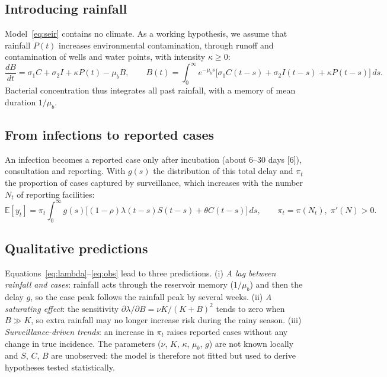 \documentclass[11pt]{article}
\begin{document}
\subsection{Introducing rainfall}
Model~\eqref{eq:seir} contains no climate. As a working hypothesis, we assume that rainfall $P(t)$ increases environmental contamination, through runoff and contamination of wells and water points, with intensity $\kappa\ge0$:
\begin{equation}
\frac{dB}{dt}=\sigma_1 C+\sigma_2 I+\kappa P(t)-\mu_b B,
\qquad
B(t)=\int_0^{\infty}e^{-\mu_b s}\big[\sigma_1C(t-s)+\sigma_2I(t-s)+\kappa P(t-s)\big]\,ds .
\label{eq:pluie}
\end{equation}
Bacterial concentration thus integrates all past rainfall, with a memory of mean duration $1/\mu_b$.

\subsection{From infections to reported cases}
An infection becomes a reported case only after incubation (about 6–30 days [6]), consultation and reporting. With $g(s)$ the distribution of this total delay and $\pi_t$ the proportion of cases captured by surveillance, which increases with the number $N_t$ of reporting facilities:
\begin{equation}
\mathbb{E}[y_t]=\pi_t\int_0^{\infty}g(s)\big[(1-\rho)\lambda(t-s)S(t-s)+\theta C(t-s)\big]\,ds,\qquad \pi_t=\pi(N_t),\;\pi'(N)>0 .
\label{eq:obs}
\end{equation}

\subsection{Qualitative predictions}
Equations~\eqref{eq:lambda}–\eqref{eq:obs} lead to three predictions. (i) \textit{A lag between rainfall and cases}: rainfall acts through the reservoir memory ($1/\mu_b$) and then the delay $g$, so the case peak follows the rainfall peak by several weeks. (ii) \textit{A saturating effect}: the sensitivity $\partial\lambda/\partial B=\nu K/(K+B)^2$ tends to zero when $B\gg K$, so extra rainfall may no longer increase risk during the rainy season. (iii) \textit{Surveillance-driven trends}: an increase in $\pi_t$ raises reported cases without any change in true incidence. The parameters ($\nu$, $K$, $\kappa$, $\mu_b$, $g$) are not known locally and $S$, $C$, $B$ are unobserved: the model is therefore not fitted but used to derive hypotheses tested statistically.
\end{document}
